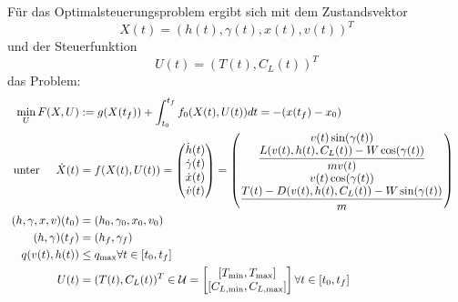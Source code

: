 \begin{problem}\label{prob:MaxRF}
    Für das Optimalsteuerungsproblem ergibt sich mit dem Zustandsvektor
    \[X(t) = (h(t),\gamma(t),x(t),v(t))^T\]
    und der Steuerfunktion
    \[U(t) = (T(t),C_L(t))^T\]
    das Problem:
    \begin{align*}
        \min_{U} F(X,U) &:= g(X(t_f)) + \int_{t_0}^{t_f} f_0(X(t),U(t)) dt = -(x(t_f) - x_0) & & \\\
        \text{unter} \hspace{5mm} \dot{X}(t) &= f(X(t),U(t)) =     
         \begin{pmatrix}
         \dot{h}(t)  \\ 
         \dot{\gamma}(t)  \\ 
         \dot{x}(t)  \\ 
         \dot{v}(t)   \\ 
	 \end{pmatrix} 
        = 
        \begin{pmatrix}
            v(t) \sin(\gamma(t)) \\ 
            \dfrac{L(v(t),h(t),C_L(t)) - W \cos(\gamma(t))}{mv(t)} \\ 
            v(t) \cos(\gamma(t)) \\ 
            \dfrac{T(t) - D(v(t),h(t),C_L(t)) - W \sin(\gamma(t))}{m}
        \end{pmatrix}  \\\
        (h,\gamma,x,v)(t_0) &= (h_0,\gamma_0,x_0,v_0)  \\\
        (h,\gamma)(t_f) &= (h_f,\gamma_f)  \\\
        q(v(t),h(t)) &\leq q_{\max}   \forall t \in [t_0,t_f]\\\
        U(t) &= (T(t),C_L(t))^T \in \mathcal{U} = \left[ 
        \begin{matrix}
            [T_{\min},T_{\max}] \\ 
            [C_{L, \min},C_{L, \max}]
        \end{matrix} 
        \right]  \forall t \in [t_0,t_f]
    \end{align*}
\end{problem}

